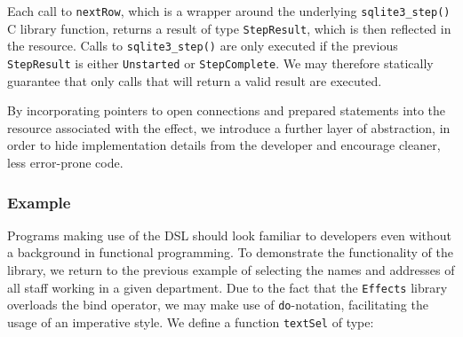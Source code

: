 



\noindent
Each call to \texttt{nextRow}, which is a wrapper around the underlying
\texttt{sqlite3\_step()} C library function, returns a result of type
\texttt{StepResult}, which is then reflected in the resource. Calls to
\texttt{sqlite3\_step()} are only executed if the previous \texttt{StepResult}
is either \texttt{Unstarted} or \texttt{StepComplete}. We may therefore
statically guarantee that only calls that will return a valid result are
executed. 

By incorporating pointers to open connections and prepared statements into the
resource associated with the effect, we introduce a further layer of
abstraction, in order to hide implementation details from the developer and
encourage cleaner, less error-prone code. 

\subsubsection{Example}

Programs making use of the DSL should look familiar to developers even without
a background in functional programming. To demonstrate the functionality of the
library, we return to the previous example of selecting the names and addresses
of all staff working in a given department. Due to the fact that the
\texttt{Effects} library overloads the bind operator, we may make use of
\texttt{do}-notation, facilitating the usage of an imperative style.
We define a function \texttt{textSel} of type:

